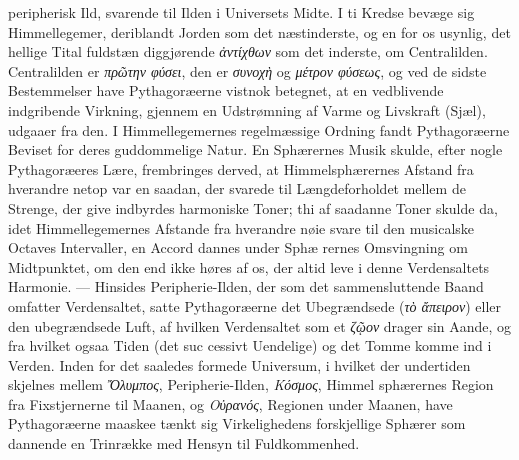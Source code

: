\documentclass[12pt,a4paper]{book}
\newcommand{\gk}[1]{\textit{#1}}
\begin{document}
peripherisk Ild, svarende til Ilden i Universets Midte. I ti
Kredse bevæge sig Himmellegemer, deriblandt Jorden som det
næstinderste, og en for os usynlig, det hellige Tital fuldstæn\-%
diggjørende \gk{ἀντίχθων} som det inderste, om Centralilden.
Centralilden er \gk{πρῶτην φύσει}, den er \gk{συνοχὴ} og \gk{μέτρον φύσεως},
og ved de sidste Bestemmelser have Pythagoræerne vistnok
betegnet, at en vedblivende indgribende Virkning, gjennem en
Udstrømning af Varme og Livskraft (Sjæl), udgaaer fra den.
I Himmellegemernes regelmæssige Ordning fandt Pythagoræerne
Beviset for deres guddommelige Natur. En Sphærernes Musik
skulde, efter nogle Pythagoræeres Lære, frembringes derved, at
Himmelsphærernes Afstand fra hverandre netop var en saadan,
der svarede til Længdeforholdet mellem de Strenge, der give
indbyrdes harmoniske Toner; thi af saadanne Toner skulde da,
idet Himmellegemernes Afstande fra hverandre nøie svare til den
musicalske Octaves Intervaller, en Accord dannes under Sphæ\-%
rernes Omsvingning om Midtpunktet, om den end ikke høres af
os, der altid leve i denne Verdensaltets Harmonie. --- Hinsides
Peripherie-Ilden, der som det sammensluttende Baand omfatter
Verdensaltet, satte Pythagoræerne det Ubegrændsede (\gk{τὸ ἄπειρον})
eller den ubegrændsede Luft, af hvilken Verdensaltet som et
\gk{ζῷον} drager sin Aande, og fra hvilket ogsaa Tiden (det suc\-%
cessivt Uendelige) og det Tomme komme ind i Verden. Inden\-%
for det saaledes formede Universum, i hvilket der undertiden
skjelnes mellem \gk{Ὄλυμπος}, Peripherie-Ilden, \gk{Κόσμος}, Himmel\-%
sphærernes Region fra Fixstjernerne til Maanen, og \gk{Οὐρανός},
Regionen under Maanen, have Pythagoræerne maaskee tænkt sig
Virkelighedens forskjellige Sphærer som dannende en Trinrække
med Hensyn til Fuldkommenhed.
\end{document}
